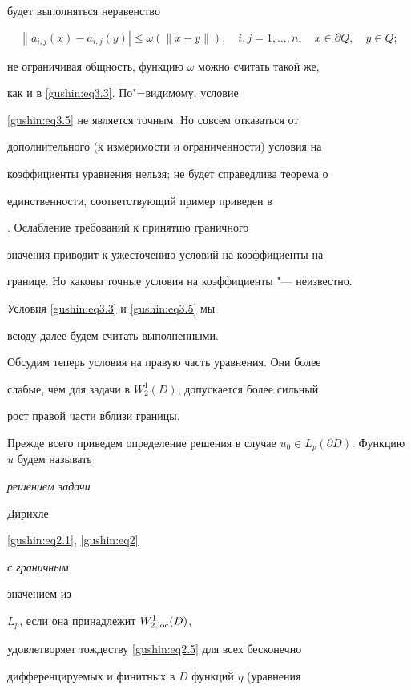 будет выполняться неравенство

\begin{equation}

\label{gushin:eq3.5} \left\| a_{i,j} (x) - a_{i,j} (y)\right| \le

\omega (\| x -y\|),\quad i,j=1,\ldots ,n,\quad x\in\partial

Q,\quad y\in Q;

\end{equation}

не ограничивая общность, функцию $\omega $ можно считать такой же,

как и в \eqref{gushin:eq3.3}. По"=видимому, условие

\eqref{gushin:eq3.5} не является точным. Но совсем отказаться от

дополнительного (к измеримости и ограниченности) условия на

коэффициенты уравнения нельзя; не будет справедлива теорема о

единственности, соответствующий пример приведен в

\cite{gushin:G88}. Ослабление требований к принятию граничного

значения приводит к ужесточению условий на коэффициенты на

границе. Но каковы точные условия на коэффициенты "--- неизвестно. 

Условия \eqref{gushin:eq3.3} и \eqref{gushin:eq3.5} мы

всюду далее будем считать выполненными.



Обсудим теперь условия на правую часть уравнения. Они более

слабые, чем для задачи в $W^1_2(D)$; допускается более сильный

рост правой части вблизи границы.



Прежде всего приведем определение решения в случае $u_0 \in

L_p(\partial D)$. Функцию $u$ будем называть {\it решением задачи

Дирихле} \eqref{gushin:eq2.1}, \eqref{gushin:eq2} {\it с граничным

значением из} $L_p$, если она принадлежит $W_{2,{\rm loc}}^1(D)$,

удовлетворяет тождеству \eqref{gushin:eq2.5} для всех бесконечно

дифференцируемых и финитных в $D$ функций $\eta$ (уравнения

